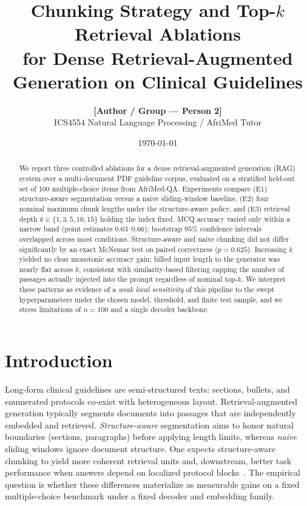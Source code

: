 \documentclass[11pt,a4paper]{article}
\title{Chunking Strategy and Top-\(k\) Retrieval Ablations\\
  for Dense Retrieval-Augmented Generation on Clinical Guidelines}
\author{\textbf{[Author / Group — Person 2]}\\
  ICS4554 Natural Language Processing / AfriMed Tutor}
\date{\today}
\begin{document}
\maketitle

\begin{abstract}
We report three controlled ablations for a dense retrieval-augmented generation (RAG) system over a multi-document PDF guideline corpus, evaluated on a stratified held-out set of 100 multiple-choice items from AfriMed-QA. Experiments compare (E1) structure-aware segmentation versus a naive sliding-window baseline, (E2) four nominal maximum chunk lengths under the structure-aware policy, and (E3) retrieval depth \(k \in \{1,3,5,10,15\}\) holding the index fixed. MCQ accuracy varied only within a narrow band (point estimates 0.63--0.66); bootstrap \(95\%\) confidence intervals overlapped across most conditions. Structure-aware and naive chunking did not differ significantly by an exact McNemar test on paired correctness (\(p = 0.625\)). Increasing \(k\) yielded no clear monotonic accuracy gain; billed input length to the generator was nearly flat across \(k\), consistent with similarity-based filtering capping the number of passages actually injected into the prompt regardless of nominal top-\(k\). We interpret these patterns as evidence of a \emph{weak local sensitivity} of this pipeline to the swept hyperparameters under the chosen model, threshold, and finite test sample, and we stress limitations of \(n=100\) and a single decoder backbone.
\end{abstract}

\section{Introduction}
Long-form clinical guidelines are semi-structured texts: sections, bullets, and enumerated protocols co-exist with heterogeneous layout. Retrieval-augmented generation typically segments documents into passages that are independently embedded and retrieved. \emph{Structure-aware} segmentation aims to honor natural boundaries (sections, paragraphs) before applying length limits, whereas \emph{naive} sliding windows ignore document structure. One expects structure-aware chunking to yield more coherent retrieval units and, downstream, better task performance when answers depend on localized protocol blocks~\cite{ragplaceholder}. The empirical question is whether these differences materialize as measurable gains on a fixed multiple-choice benchmark under a fixed decoder and embedding family.
\end{document}
